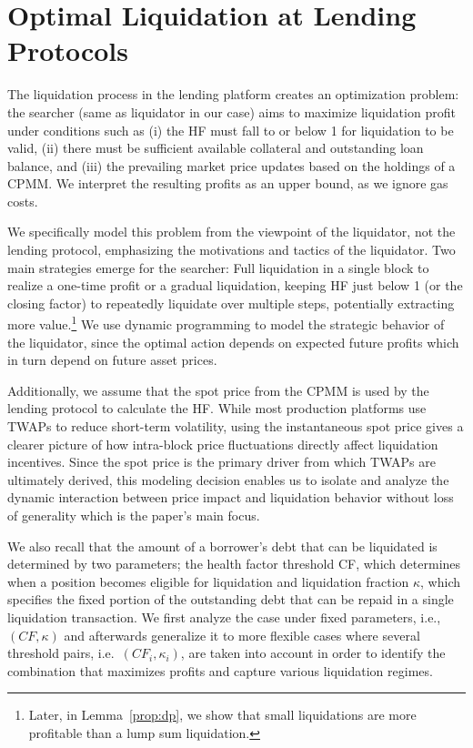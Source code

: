 \documentclass[11pt]{article} %
\begin{document}
\section{Optimal Liquidation at Lending Protocols}\label{sec:optimiz}
The liquidation process in the lending platform creates an optimization problem: the searcher (same as liquidator in our case) aims to maximize liquidation profit under conditions such as (i) the HF must fall to or below 1 for liquidation to be valid, (ii) there must be sufficient available collateral and outstanding loan balance, and (iii) the prevailing market price updates based on the holdings of a CPMM. We interpret the resulting profits as an upper bound, as we ignore gas costs.

We specifically model this problem from the viewpoint of the liquidator, not the lending protocol, emphasizing the motivations and tactics of the liquidator. Two main strategies emerge for the searcher: Full liquidation in a single block to realize a one-time profit or a gradual liquidation, keeping HF just below 1 (or the closing factor) to repeatedly liquidate over multiple steps, potentially extracting more value.\footnote{Later, in Lemma~\ref{prop:dp}, we show that small liquidations are more profitable than a lump sum liquidation.} We use dynamic programming to model the strategic behavior of the liquidator, since the optimal action depends on expected future profits which in turn depend on future asset prices.

Additionally, we assume that the spot price from the CPMM is used by the lending protocol to calculate the HF. While most production platforms use TWAPs to reduce short-term volatility, using the instantaneous spot price gives a clearer picture of how intra-block price fluctuations directly affect liquidation incentives. Since the spot price is the primary driver from which TWAPs are ultimately derived, this modeling decision enables us to isolate and analyze the dynamic interaction between price impact and liquidation behavior without loss of generality which is the paper's main focus.

We also recall that the amount of a borrower's debt that can be liquidated is determined by two parameters; the health factor threshold CF, which determines when a position becomes eligible for liquidation and liquidation fraction $\kappa$, which specifies the fixed portion of the outstanding debt that can be repaid in a single liquidation transaction. We first analyze the case under fixed parameters, i.e., $(CF,\kappa)$ and afterwards generalize it to more flexible cases where several threshold pairs, i.e.\ $(CF_i,\kappa_i)$, are taken into account in order to identify the combination that maximizes profits and capture various liquidation regimes.
\end{document}
